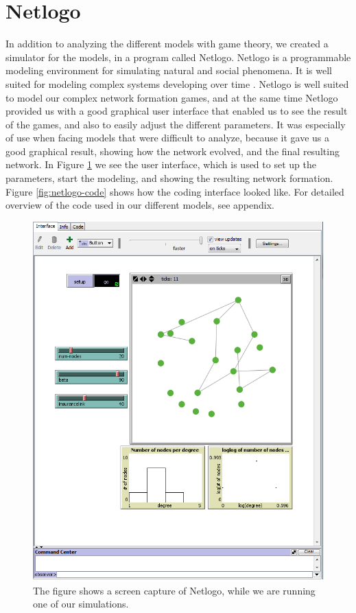 \section{Netlogo}
In addition to analyzing the different models with game theory, we created a simulator for the models, in a program called Netlogo. Netlogo is a programmable modeling environment for simulating natural and social phenomena. It is well suited for modeling complex systems developing over time \cite{netlogo}.
Netlogo is well suited to model our complex network formation games, and at the same time Netlogo provided us with a good graphical user interface that enabled us to see the result of the games, and also to easily adjust the different parameters. It was especially of use when facing models that were difficult to analyze, because it gave us a good graphical result, showing how the network evolved, and the final resulting network.  
In Figure \ref{fig:netlogo} we see the user interface, which is used to set up the parameters, start the modeling, and showing the resulting network formation. Figure \ref{fig:netlogo-code} shows how the coding interface looked like. For detailed overview of the code used in our different models, see appendix.
\begin{figure}[h]
\centering
  \includegraphics[width=0.9\linewidth]{../Figures/netlogoexample.png}
  \caption{\label{fig:netlogo} The figure shows a screen capture of Netlogo, while we are running one of our simulations.}

\end{figure}
